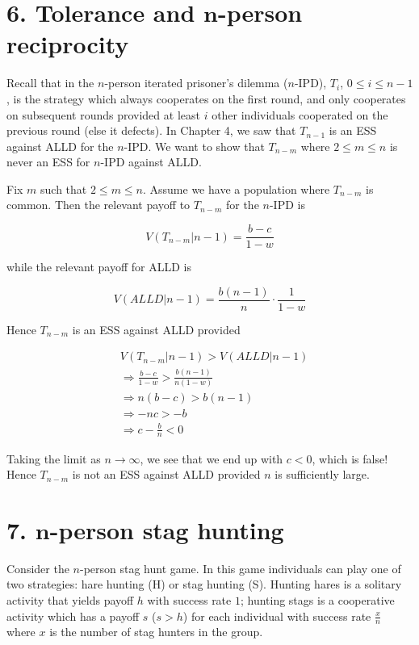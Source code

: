 \documentclass{article}
\begin{document}
\section*{6. Tolerance and $\boldsymbol{n}$-person reciprocity}

Recall that in the $n$-person iterated prisoner's dilemma ($n$-IPD),
$T_i$, $0 \leq i \leq n - 1$, is the strategy which always cooperates on
the first round, and only cooperates on subsequent rounds provided at
least $i$ other individuals cooperated on the previous round (else it
defects). In Chapter 4, we saw that $T_{n - 1}$ is an ESS against ALLD
for the $n$-IPD. We want to show that $T_{n - m}$ where $2 \leq m \leq
n$ is never an ESS for $n$-IPD against ALLD.

Fix $m$ such that $2 \leq m \leq n$. Assume we have a population where
$T_{n - m}$ is common. Then the relevant payoff to $T_{n - m}$ for the
$n$-IPD is

\begin{equation*}
    V(T_{n - m}|n - 1) = \frac{b - c}{1 - w}
\end{equation*}

while the relevant payoff for ALLD is

\begin{equation*}
    V(ALLD|n - 1) = \frac{b (n - 1)}{n} \cdot \frac{1}{1 - w}
\end{equation*}

Hence $T_{n - m}$ is an ESS against ALLD provided

\begin{align*}
    &V(T_{n - m}|n - 1) > V(ALLD|n - 1) \\
    &\Rightarrow \frac{b - c}{1 - w} > \frac{b (n - 1)}{n (1 - w)} \\
    &\Rightarrow n (b - c) > b (n - 1) \\
    &\Rightarrow - n c > - b \\
    &\Rightarrow c - \frac{b}{n} < 0
\end{align*}

Taking the limit as $n \to \infty$, we see that we end up with $c < 0$,
which is false! Hence $T_{n - m}$ is not an ESS against ALLD provided
$n$ is sufficiently large.

\section*{7. $\boldsymbol{n}$-person stag hunting}

Consider the $n$-person stag hunt game. In this game individuals can
play one of two strategies: hare hunting (H) or stag hunting (S).
Hunting hares is a solitary activity that yields payoff $h$ with success
rate $1$; hunting stags is a cooperative activity which has a payoff $s$
($s > h$) for each individual with success rate $\frac{x}{n}$ where $x$
is the number of stag hunters in the group.
\end{document}
